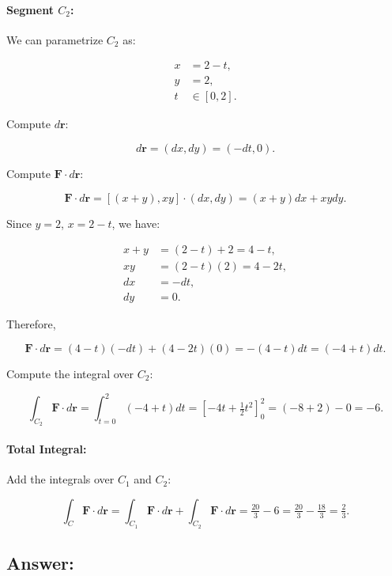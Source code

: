\documentclass[11pt]{article}
\begin{document}
\paragraph{Segment $C_2$:}

We can parametrize $C_2$ as:

\[
\begin{aligned}
x &= 2 - t, \\
y &= 2, \\
t &\in [0, 2].
\end{aligned}
\]

Compute $d\mathbf{r}$:

\[
d\mathbf{r} = (dx, dy) = (-dt, 0).
\]

Compute $\mathbf{F} \cdot d\mathbf{r}$:

\[
\mathbf{F} \cdot d\mathbf{r} = [(x + y), x y] \cdot (dx, dy) = (x + y) dx + x y dy.
\]

Since $y = 2$, $x = 2 - t$, we have:

\[
\begin{aligned}
x + y &= (2 - t) + 2 = 4 - t, \\
x y &= (2 - t)(2) = 4 - 2t, \\
dx &= -dt, \\
dy &= 0.
\end{aligned}
\]

Therefore,

\[
\mathbf{F} \cdot d\mathbf{r} = (4 - t)(-dt) + (4 - 2t)(0) = -(4 - t) dt = (-4 + t) dt.
\]

Compute the integral over $C_2$:

\[
\int_{C_2} \mathbf{F} \cdot d\mathbf{r} = \int_{t=0}^{2} (-4 + t) dt = \left[ -4t + \tfrac{1}{2} t^2 \right]_0^2 = \left( -8 + 2 \right) - 0 = -6.
\]

\paragraph{Total Integral:}

Add the integrals over $C_1$ and $C_2$:

\[
\int_{C} \mathbf{F} \cdot d\mathbf{r} = \int_{C_1} \mathbf{F} \cdot d\mathbf{r} + \int_{C_2} \mathbf{F} \cdot d\mathbf{r} = \tfrac{20}{3} - 6 = \tfrac{20}{3} - \tfrac{18}{3} = \tfrac{2}{3}.
\]

\newpage

\subsection{Answer:}
\end{document}
